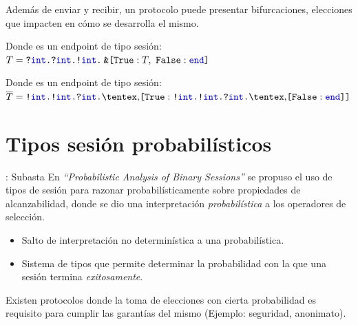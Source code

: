 \begin{frame}{\insertsubsection}
	Además de enviar y recibir, un protocolo puede presentar bifurcaciones,
	elecciones que impacten en cómo se desarrolla el mismo.

	\SumServerRec

	Donde  es un endpoint de tipo sesión: $\SessionType = \In\tint{ \In\tint{
		\Out\tint\BinaryPBranch[]\T\End } }$
\end{frame}

\begin{frame}{\insertsubsection}
	\SumThreeNumClient
	Donde  es un endpoint de tipo sesión: $\dual\SessionType = \Out\tint{ \Out\tint{
		\In\tint{\Choice\set{\Tag[True]: \Out\tint{ \Out\tint{
		\In\tint{\Choice\set{\Tag[False]: \End} }}}} }}}$
\end{frame}

\section{Tipos sesión probabilísticos}

\begin{frame}{\insertsection: Subasta}
	En \emph{``Probabilistic Analysis of Binary Sessions''} se propuso el uso de tipos de sesión
	para razonar probabilísticamente sobre propiedades de alcanzabilidad,
	donde se dio una interpretación \emph{probabilística} a los operadores
	de selección.

	\begin{itemize}
		\item Salto de interpretación no determinística a una
		probabilística.
		\item Sistema de tipos que permite determinar la probabilidad con la que una
			sesión termina \emph{exitosamente}.
	\end{itemize}

	Existen protocolos donde la toma de elecciones con cierta probabilidad
	es requisito para cumplir las garantías del mismo (Ejemplo: seguridad, anonimato).
\end{frame}

